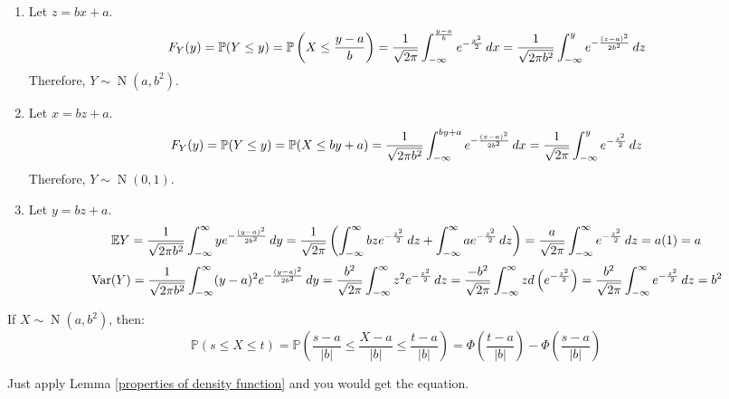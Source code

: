 \documentclass{huhtakm-template-book}
\newcommand{\prob}{\mathbb{P}}
\newcommand{\expect}{\mathbb{E}}
\DeclareMathOperator{\N}{N}
\DeclareMathOperator{\Var}{Var}
\begin{document}
    \begin{proofing}
        \begin{enumerate}
            \item Let $z=bx+a$.
            \begin{equation*}
                F_{Y}(y)=\prob(Y\leq y)=\prob\left(X\leq\frac{y-a}{b}\right)=\frac{1}{\sqrt{2\pi}}\intlu{-\infty}{\frac{y-a}{b}}e^{-\frac{x^{2}}{2}}\,dx=\frac{1}{\sqrt{2\pi b^{2}}}\intlu{-\infty}{y}e^{-\frac{(z-a)^{2}}{2b^{2}}}\,dz
            \end{equation*}
            Therefore, $Y\sim\N(a,b^{2})$.
            \item Let $x=bz+a$.
            \begin{equation*}
                F_{Y}(y)=\prob(Y\leq y)=\prob(X\leq by+a)=\frac{1}{\sqrt{2\pi b^{2}}}\intlu{-\infty}{by+a}e^{-\frac{(x-a)^{2}}{2b^{2}}}\,dx=\frac{1}{\sqrt{2\pi}}\intlu{-\infty}{y}e^{-\frac{z^{2}}{2}}\,dz
            \end{equation*}
            Therefore, $Y\sim\N(0,1)$.
            \item Let $y=bz+a$.
            \begin{equation*}
                \expect Y=\frac{1}{\sqrt{2\pi b^{2}}}\intinfty ye^{-\frac{(y-a)^{2}}{2b^{2}}}\,dy=\frac{1}{\sqrt{2\pi}}\left(\intinfty bze^{-\frac{z^{2}}{2}}\,dz+\intinfty ae^{-\frac{z^{2}}{2}}\,dz\right)=\frac{a}{\sqrt{2\pi}}\intinfty e^{-\frac{z^{2}}{2}}\,dz=a(1)=a
            \end{equation*}
            \begin{equation*}
                \Var(Y)=\frac{1}{\sqrt{2\pi b^{2}}}\intinfty(y-a)^{2}e^{-\frac{(y-a)^{2}}{2b^{2}}}\,dy=\frac{b^{2}}{\sqrt{2\pi}}\intinfty z^{2}e^{-\frac{z^{2}}{2}}\,dz=\frac{-b^{2}}{\sqrt{2\pi}}\intinfty zd\left(e^{-\frac{z^{2}}{2}}\right)=\frac{b^{2}}{\sqrt{2\pi}}\intinfty e^{-\frac{z^{2}}{2}}\,dz=b^{2}
            \end{equation*}
        \end{enumerate}
    \end{proofing}
    \begin{lem}
        If $X\sim\N(a,b^{2})$, then:
        \begin{equation*}
            \prob(s\leq X\leq t)=\prob\left(\frac{s-a}{|b|}\leq\frac{X-a}{|b|}\leq\frac{t-a}{|b|}\right)=\Phi\left(\frac{t-a}{|b|}\right)-\Phi\left(\frac{s-a}{|b|}\right)
        \end{equation*}
    \end{lem}
    \begin{proofing}
        Just apply Lemma \ref{properties of density function} and you would get the equation.
    \end{proofing}
\end{document}
